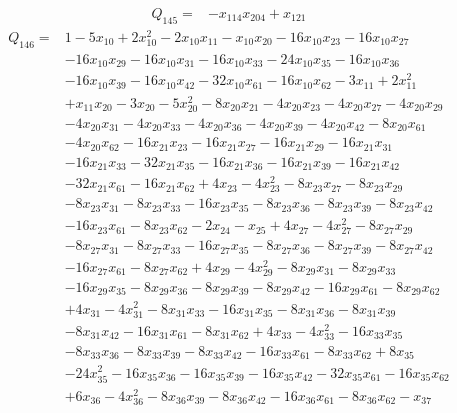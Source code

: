 \begin{equation*}\begin{aligned}
Q_{145}={}& -x_{114}x_{204}+x_{121}
\end{aligned}\end{equation*}
\begin{equation*}\begin{aligned}
Q_{146}={}& 1-5x_{10}+2x_{10}^{2}-2x_{10}x_{11}-x_{10}x_{20}-16x_{10}x_{23}-16x_{10}x_{27}\\
& -16x_{10}x_{29}-16x_{10}x_{31}-16x_{10}x_{33}-24x_{10}x_{35}-16x_{10}x_{36}\\
& -16x_{10}x_{39}-16x_{10}x_{42}-32x_{10}x_{61}-16x_{10}x_{62}-3x_{11}+2x_{11}^{2}\\
& +x_{11}x_{20}-3x_{20}-5x_{20}^{2}-8x_{20}x_{21}-4x_{20}x_{23}-4x_{20}x_{27}-4x_{20}x_{29}\\
& -4x_{20}x_{31}-4x_{20}x_{33}-4x_{20}x_{36}-4x_{20}x_{39}-4x_{20}x_{42}-8x_{20}x_{61}\\
& -4x_{20}x_{62}-16x_{21}x_{23}-16x_{21}x_{27}-16x_{21}x_{29}-16x_{21}x_{31}\\
& -16x_{21}x_{33}-32x_{21}x_{35}-16x_{21}x_{36}-16x_{21}x_{39}-16x_{21}x_{42}\\
& -32x_{21}x_{61}-16x_{21}x_{62}+4x_{23}-4x_{23}^{2}-8x_{23}x_{27}-8x_{23}x_{29}\\
& -8x_{23}x_{31}-8x_{23}x_{33}-16x_{23}x_{35}-8x_{23}x_{36}-8x_{23}x_{39}-8x_{23}x_{42}\\
& -16x_{23}x_{61}-8x_{23}x_{62}-2x_{24}-x_{25}+4x_{27}-4x_{27}^{2}-8x_{27}x_{29}\\
& -8x_{27}x_{31}-8x_{27}x_{33}-16x_{27}x_{35}-8x_{27}x_{36}-8x_{27}x_{39}-8x_{27}x_{42}\\
& -16x_{27}x_{61}-8x_{27}x_{62}+4x_{29}-4x_{29}^{2}-8x_{29}x_{31}-8x_{29}x_{33}\\
& -16x_{29}x_{35}-8x_{29}x_{36}-8x_{29}x_{39}-8x_{29}x_{42}-16x_{29}x_{61}-8x_{29}x_{62}\\
& +4x_{31}-4x_{31}^{2}-8x_{31}x_{33}-16x_{31}x_{35}-8x_{31}x_{36}-8x_{31}x_{39}\\
& -8x_{31}x_{42}-16x_{31}x_{61}-8x_{31}x_{62}+4x_{33}-4x_{33}^{2}-16x_{33}x_{35}\\
& -8x_{33}x_{36}-8x_{33}x_{39}-8x_{33}x_{42}-16x_{33}x_{61}-8x_{33}x_{62}+8x_{35}\\
& -24x_{35}^{2}-16x_{35}x_{36}-16x_{35}x_{39}-16x_{35}x_{42}-32x_{35}x_{61}-16x_{35}x_{62}\\
& +6x_{36}-4x_{36}^{2}-8x_{36}x_{39}-8x_{36}x_{42}-16x_{36}x_{61}-8x_{36}x_{62}-x_{37}\\

\end{aligned}
\end{equation*}

